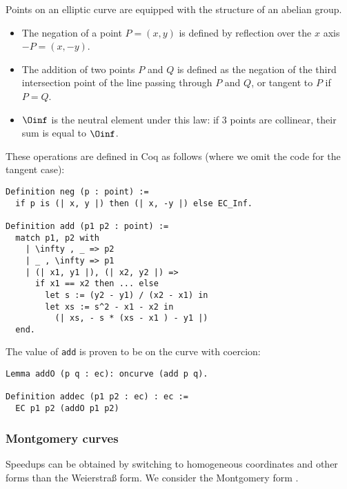 Points on an elliptic curve are equipped with the structure of an abelian group.
\begin{itemize}
  \item The negation of a point $P = (x,y)$ is defined by reflection over the $x$ axis $-P = (x, -y)$.
  \item The addition of two points $P$ and $Q$ is defined as the negation of the third intersection point
        of the line passing through $P$ and $Q$, or tangent to $P$ if $P = Q$.
  \item $\Oinf$ is the neutral element under this law: if 3 points are collinear, their sum is equal to $\Oinf$.
\end{itemize}
These operations are defined in Coq as follows (where we omit the code for the tangent case):
\begin{lstlisting}[language=Coq]
Definition neg (p : point) :=
  if p is (| x, y |) then (| x, -y |) else EC_Inf.

Definition add (p1 p2 : point) :=
  match p1, p2 with
    | \infty , _ => p2
    | _ , \infty => p1
    | (| x1, y1 |), (| x2, y2 |) =>
      if x1 == x2 then ... else
        let s := (y2 - y1) / (x2 - x1) in
        let xs := s^2 - x1 - x2 in
          (| xs, - s * (xs - x1 ) - y1 |)
  end.
\end{lstlisting}
The value of \texttt{add} is proven to be on the curve with coercion:
\begin{lstlisting}[language=Coq]
Lemma addO (p q : ec): oncurve (add p q).

Definition addec (p1 p2 : ec) : ec :=
  EC p1 p2 (addO p1 p2)
\end{lstlisting}

\subsubsection{Montgomery curves}
\label{subsec:ECC-Montgomery}

Speedups can be obtained by switching to homogeneous coordinates and other forms
than the Weierstra{\ss} form. We consider the Montgomery form \cite{MontgomerySpeeding}.

